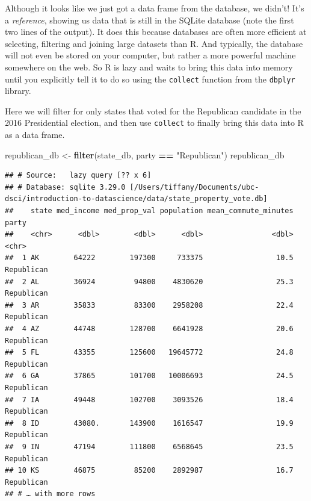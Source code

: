 \documentclass[
]{article}
\newenvironment{Shaded}{\begin{snugshade}}{\end{snugshade}}
\newcommand{\KeywordTok}[1]{\textcolor[rgb]{0.13,0.29,0.53}{\textbf{#1}}}
\newcommand{\NormalTok}[1]{#1}
\newcommand{\OperatorTok}[1]{\textcolor[rgb]{0.81,0.36,0.00}{\textbf{#1}}}
\newcommand{\StringTok}[1]{\textcolor[rgb]{0.31,0.60,0.02}{#1}}
\begin{document}
Although it looks like we just got a data frame from the database, we
didn't! It's a \emph{reference}, showing us data that is still in the
SQLite database (note the first two lines of the output). It does this
because databases are often more efficient at selecting, filtering and
joining large datasets than R. And typically, the database will not even
be stored on your computer, but rather a more powerful machine somewhere
on the web. So R is lazy and waits to bring this data into memory until
you explicitly tell it to do so using the \texttt{collect} function from
the \texttt{dbplyr} library.

Here we will filter for only states that voted for the Republican
candidate in the 2016 Presidential election, and then use
\texttt{collect} to finally bring this data into R as a data frame.

\begin{Shaded}
\begin{Highlighting}[]
\NormalTok{republican\_db <{-}}\StringTok{ }\KeywordTok{filter}\NormalTok{(state\_db, party }\OperatorTok{==}\StringTok{ "Republican"}\NormalTok{)}
\NormalTok{republican\_db}
\end{Highlighting}
\end{Shaded}

\begin{verbatim}
## # Source:   lazy query [?? x 6]
## # Database: sqlite 3.29.0 [/Users/tiffany/Documents/ubc-dsci/introduction-to-datascience/data/state_property_vote.db]
##    state med_income med_prop_val population mean_commute_minutes party     
##    <chr>      <dbl>        <dbl>      <dbl>                <dbl> <chr>     
##  1 AK        64222        197300     733375                 10.5 Republican
##  2 AL        36924         94800    4830620                 25.3 Republican
##  3 AR        35833         83300    2958208                 22.4 Republican
##  4 AZ        44748        128700    6641928                 20.6 Republican
##  5 FL        43355        125600   19645772                 24.8 Republican
##  6 GA        37865        101700   10006693                 24.5 Republican
##  7 IA        49448        102700    3093526                 18.4 Republican
##  8 ID        43080.       143900    1616547                 19.9 Republican
##  9 IN        47194        111800    6568645                 23.5 Republican
## 10 KS        46875         85200    2892987                 16.7 Republican
## # … with more rows
\end{verbatim}
\end{document}
